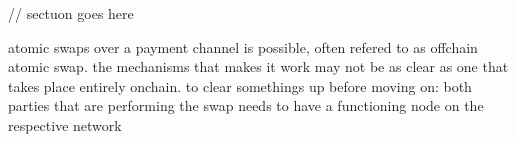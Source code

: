 // sectuon goes here

atomic swaps over a payment channel is possible, often refered to as offchain atomic swap. the mechanisms that makes it work may not be as clear as one that takes place entirely onchain. 
to clear somethings up before moving on: both parties that are performing the swap needs to have a functioning node on the respective network 
